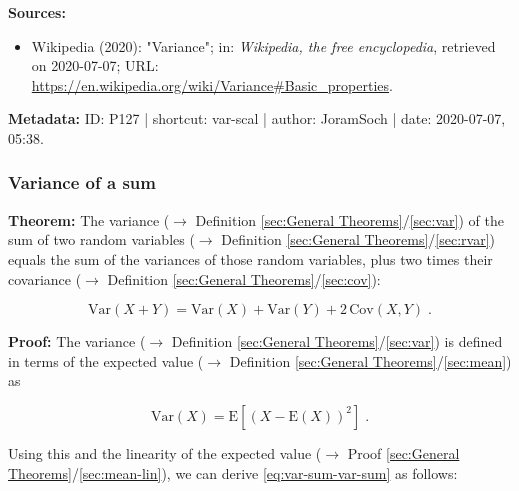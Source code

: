 \documentclass[a4paper,12pt,twoside]{book}
\begin{document}
\vspace{1em}
\textbf{Sources:}
\begin{itemize}
\item Wikipedia (2020): "Variance"; in: \textit{Wikipedia, the free encyclopedia}, retrieved on 2020-07-07; URL: \url{https://en.wikipedia.org/wiki/Variance#Basic_properties}.
\end{itemize}


\vspace{1em}
\textbf{Metadata:} ID: P127 | shortcut: var-scal | author: JoramSoch | date: 2020-07-07, 05:38.
\vspace{1em}



\subsubsection[\textbf{Variance of a sum}]{Variance of a sum} \label{sec:var-sum}
\setcounter{equation}{0}

\textbf{Theorem:} The variance ($\rightarrow$ Definition \ref{sec:General Theorems}/\ref{sec:var}) of the sum of two random variables ($\rightarrow$ Definition \ref{sec:General Theorems}/\ref{sec:rvar}) equals the sum of the variances of those random variables, plus two times their covariance ($\rightarrow$ Definition \ref{sec:General Theorems}/\ref{sec:cov}):

\begin{equation} \label{eq:var-sum-var-sum}
\mathrm{Var}(X+Y) = \mathrm{Var}(X) + \mathrm{Var}(Y) + 2 \, \mathrm{Cov}(X,Y) \; .
\end{equation}


\vspace{1em}
\textbf{Proof:} The variance ($\rightarrow$ Definition \ref{sec:General Theorems}/\ref{sec:var}) is defined in terms of the expected value ($\rightarrow$ Definition \ref{sec:General Theorems}/\ref{sec:mean}) as

\begin{equation} \label{eq:var-sum-var}
\mathrm{Var}(X) = \mathrm{E}\left[ (X-\mathrm{E}(X))^2 \right] \; .
\end{equation}

Using this and the linearity of the expected value ($\rightarrow$ Proof \ref{sec:General Theorems}/\ref{sec:mean-lin}), we can derive \eqref{eq:var-sum-var-sum} as follows:
\end{document}
